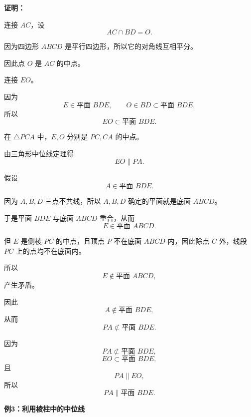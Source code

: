 \begin{examplebox}
	\textbf{证明：}

	\begin{description}[
			style=nextline,
			leftmargin=2.8em,
			labelsep=0.5em,
			itemsep=0.45em
		]
		\item[\textbf{第一步（构造面内参照线）：}]
		      连接 $AC$，设
		      \[
			      AC\cap BD=O.
		      \]

		      因为四边形 $ABCD$ 是平行四边形，所以它的对角线互相平分。

		      因此点 $O$ 是 $AC$ 的中点。

		      连接 $EO$。

		      因为
		      \[
			      E\in\text{平面 }BDE,
			      \qquad
			      O\in BD\subset\text{平面 }BDE,
		      \]
		      所以
		      \[
			      EO\subset\text{平面 }BDE.
		      \]

		\item[\textbf{第二步（证明线线平行）：}]
		      在 $\triangle PCA$ 中，$E,O$ 分别是 $PC,CA$ 的中点。

		      由三角形中位线定理得
		      \[
			      EO\parallel PA.
		      \]

		\item[\textbf{第三步（确认目标线不在平面内）：}]
		      假设
		      \[
			      A\in\text{平面 }BDE.
		      \]

		      因为 $A,B,D$ 三点不共线，所以 $A,B,D$ 确定的平面就是底面 $ABCD$。

		      于是平面 $BDE$ 与底面 $ABCD$ 重合，从而
		      \[
			      E\in\text{平面 }ABCD.
		      \]

		      但 $E$ 是侧棱 $PC$ 的中点，且顶点 $P$ 不在底面 $ABCD$ 内，因此除点 $C$ 外，线段 $PC$ 上的点均不在底面内。

		      所以
		      \[
			      E\notin\text{平面 }ABCD,
		      \]
		      产生矛盾。

		      因此
		      \[
			      A\notin\text{平面 }BDE,
		      \]
		      从而
		      \[
			      PA\not\subset\text{平面 }BDE.
		      \]

		\item[\textbf{第四步（套用判定定理）：}]
		      因为
		      \[
			      PA\not\subset\text{平面 }BDE,
		      \]
		      \[
			      EO\subset\text{平面 }BDE,
		      \]
		      且
		      \[
			      PA\parallel EO,
		      \]
		      所以
		      \[
			      PA\parallel\text{平面 }BDE.
		      \]
	\end{description}

	\medskip
	\textbf{\textcolor{CExample}{例3：利用棱柱中的中位线}}


\end{examplebox}

